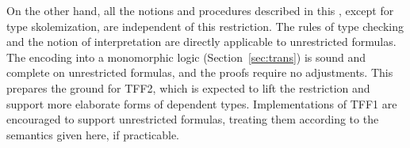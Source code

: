 On the other hand, all the notions and procedures described in this \paper,
except for type skolemization, are independent of this restriction.
The rules of type checking and the notion of interpretation are
directly applicable to unrestricted formulas. The encoding into a monomorphic
logic (Section~\ref{sec:trans}) is sound and complete on unrestricted formulas,
and the proofs require
no adjustments. This prepares the ground for TFF2, which is expected to lift the
restriction and support more elaborate forms of dependent types. Implementations
of TFF1 are encouraged to support unrestricted formulas, treating them according
to the semantics given here, if practicable.


